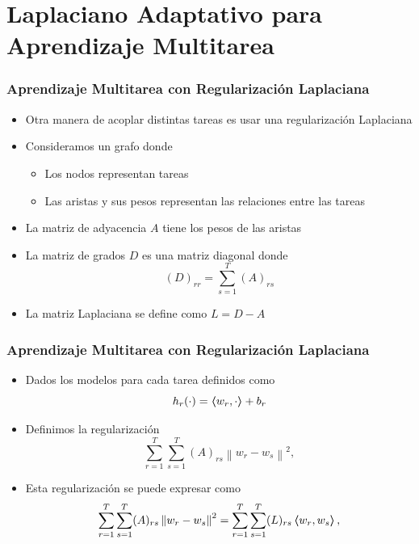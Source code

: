 \documentclass[aspectratio=43]{beamer}
\newcommand{\norm}[1]{\left\lVert#1\right\rVert}
\newcommand{\hypf}{h}
\newcommand{\dotp}[2]{\bm{\left\langle} #1, #2 \bm{\right\rangle}}
\newcommand{\ntasks}{T}
\begin{document}
\begin{frame}
  \end{frame}




\section{Laplaciano Adaptativo para Aprendizaje Multitarea}

\begin{frame}
      \frametitle{Aprendizaje Multitarea con Regularización Laplaciana}

      \begin{itemize}
            \item Otra manera de acoplar distintas tareas es usar una regularización Laplaciana
            \item Consideramos un grafo donde
            \begin{itemize}
                  \item Los nodos representan tareas
                  \item Las aristas y sus pesos representan las relaciones entre las tareas
            \end{itemize}
            \item La matriz de adyacencia $A$ tiene los pesos de las aristas
            \item La matriz de grados $D$ es una matriz diagonal donde
            $$ (D)_{rr} = \sum_{s=1}^\ntasks (A)_{rs}$$
            \item La matriz Laplaciana se define como $L = D - A$
      \end{itemize}
      
\end{frame}


\begin{frame}
      \frametitle{Aprendizaje Multitarea con Regularización Laplaciana}

      \begin{itemize}
            \item Dados los modelos para cada tarea definidos como
            $$ \hypf_r(\cdot) = \dotp{w_r}{\cdot} + b_r$$
            \item Definimos la regularización
            \begin{equation}
                  \nonumber
                  \sum_{r=1}^\ntasks \sum_{s=1}^\ntasks (A)_{rs} \norm{w_r - w_s}^2 ,
              \end{equation}
            \item Esta regularización se puede expresar como
            \begin{equation}
                  \nonumber
                  \sum_{r=1}^\ntasks \sum_{s=1}^\ntasks (A)_{rs} \norm{w_r - w_s}^2 = \sum_{r=1}^\ntasks \sum_{s=1}^\ntasks (L)_{rs} \dotp{w_r}{w_s} ,
              \end{equation}
      \end{itemize}
      
\end{frame}
\end{document}
